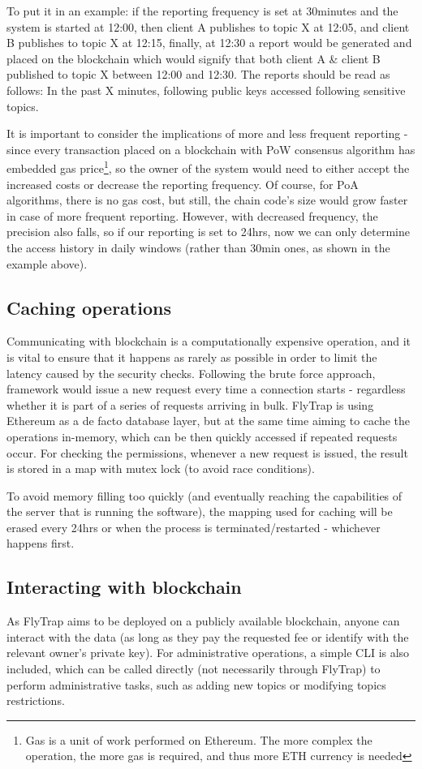 To put it in an example: if the reporting frequency is set at 30minutes and the system is started at 12:00, then client A publishes to topic  X at 12:05, and client B publishes to topic X at 12:15, finally, at 12:30 a report would be generated and placed on the blockchain which would signify that both client A \& client B published to topic X between 12:00 and 12:30. The reports should be read as follows: In the past X minutes, following public keys accessed following sensitive topics. 

It is important to consider the implications of more and less frequent reporting - since every transaction placed on a blockchain with PoW consensus algorithm has embedded gas price\footnote{Gas is a unit of work performed on Ethereum. The more complex the operation, the more gas is required, and thus more ETH currency is needed}, so the owner of the system would need to either accept the increased costs or decrease the reporting frequency. Of course, for PoA algorithms, there is no gas cost, but still, the chain code's size would grow faster in case of more frequent reporting. However, with decreased frequency, the precision also falls, so if our reporting is set to 24hrs, now we can only determine the access history in daily windows (rather than 30min ones, as shown in the example above).
\subsection{Caching operations}
Communicating with blockchain is a computationally expensive operation, and it is vital to ensure that it happens as rarely as possible in order to limit the latency caused by the security checks. Following the brute force approach, framework would issue a new request every time a connection starts - regardless whether it is part of a series of requests arriving in bulk. FlyTrap is using Ethereum as a de facto database layer, but at the same time aiming to cache the operations in-memory, which can be then quickly accessed if repeated requests occur. For checking the permissions, whenever a new request is issued, the result is stored in a map with mutex lock (to avoid race conditions).

To avoid memory filling too quickly (and eventually reaching the capabilities of the server that is running the software), the mapping used for caching will be erased every 24hrs or when the process is terminated/restarted - whichever happens first.

\subsection{Interacting with blockchain}\label{sec:interact}
As FlyTrap aims to be deployed on a publicly available blockchain, anyone can interact with the data (as long as they pay the requested fee or identify with the relevant owner's private key). For administrative operations, a simple CLI is also included, which can be called directly (not necessarily through FlyTrap) to perform administrative tasks, such as adding new topics or modifying topics restrictions.

